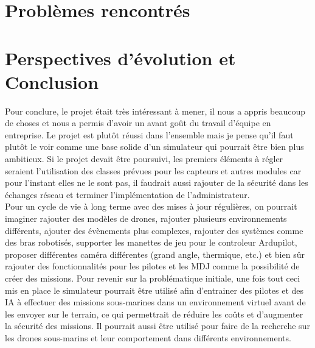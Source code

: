\documentclass{scrartcl}
\begin{document}
\section{Problèmes rencontrés}
\label{sec:problemes}



\section{Perspectives d'évolution et Conclusion}
\label{sec:perspectives}


Pour conclure, le projet était très intéressant à mener, il nous a appris beaucoup de choses et nous a permis d'avoir un avant
goût du travail d'équipe en entreprise. Le projet est plutôt réussi dans l'ensemble mais je pense qu'il faut plutôt le voir comme une base solide
d'un simulateur qui pourrait être bien plus ambitieux. Si le projet devait être poursuivi, les premiers éléments à régler seraient
l'utilisation des classes prévues pour les capteurs et autres modules car pour l'instant elles ne le sont pas, il faudrait aussi
rajouter de la sécurité dans les échanges réseau et terminer l'implémentation de l'administrateur.\\
Pour un cycle de vie à long terme avec des mises à jour régulières, on pourrait imaginer rajouter des modèles de drones,
rajouter plusieurs environnements différents, ajouter des évènements plus complexes, rajouter des systèmes comme des bras robotisés,
supporter les manettes de jeu pour le controleur Ardupilot, proposer différentes caméra différentes (grand angle, thermique, etc.) et bien sûr
rajouter des fonctionnalités pour les pilotes et les MDJ comme la possibilité de créer des missions.
Pour revenir sur la problématique initiale, une fois tout ceci mis en place le simulateur pourrait être utilisé afin d'entrainer des pilotes et des IA à effectuer
des missions sous-marines dans un environnement virtuel avant de les envoyer sur le terrain, ce qui permettrait de réduire les coûts et
d'augmenter la sécurité des missions. Il pourrait aussi être utilisé pour faire de la recherche sur les drones sous-marins et leur comportement dans différents environnements.
\end{document}
